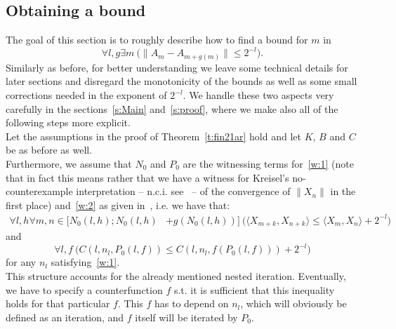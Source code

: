 \subsection{Obtaining a bound}\label{s:terms}
The goal of this section is to roughly describe how to find a bound for $m$ in
\[
\forall l,g \exists m\ \big( \|A_m-A_{m+g(m)}\|\leq 2^{-l} \big).
\]
Similarly as before, for better understanding we leave some technical details
for later sections and disregard the monotonicity of the bounds as well as some
small corrections needed in the exponent of $2^{-l}$.
We handle these two aspects very carefully in the sections~\ref{s:Main} and~\ref{s:proof}, where we make also
all of the following steps more explicit.\\
Let the assumptions in the proof of Theorem~\ref{t:fin21ar} hold and let $K$, 
$B$ and $C$ be as before as well.\\
Furthermore, we assume that $N_0$ and $P_0$ are the witnessing terms for~\eqref{w:1} (note that in
fact this means rather that we have a witness for Kreisel's no-counterexample interpretation -- n.c.i. see~\cite{Kreisel51, Kreisel1959} -- of the
convergence of $\|X_n\|$ in the first place) and~\eqref{w:2} as given in~\cite{Kohlenbach08}, i.e. we have that:
\begin{align*}
\forall l,h \forall m,n\in[N_0(l,h) ; N_0(l,h)&+g(N_0(l,h))]\ \big( 
\langle X_{m+k},X_{n+k}\rangle \leq \langle X_{m},X_{n}\rangle + 2^{-l} \big)
\end{align*}
and
\[
\forall l,f \ \big( C(l,n_l,P_0(l,f))\leq C(l,n_l,f(P_0(l,f))) + 2^{-l} \big)
\]
for any $n_l$ satisfying~\eqref{w:1}.\\ This structure accounts for the already mentioned nested iteration.  
Eventually, we have to specify a counterfunction $f$ s.t. it is sufficient that this inequality holds for that particular $f$. 
This $f$ has to depend on $n_l$, which will obviously be defined as an iteration, and $f$ itself will be iterated by $P_0$.\\
